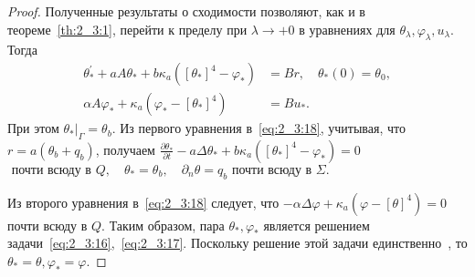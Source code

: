 \begin{proof}
    Полученные результаты о сходимости позволяют, как и в теореме~\ref{th:2_3:1},
    перейти к пределу при $\lambda \rightarrow+0$ в уравнениях для $\theta_{\lambda},
    \varphi_{\lambda}, u_{\lambda}$.
    Тогда
    \begin{equation}
        \label{eq:2_3:18}
        \begin{aligned}
            \theta_{*}^{\prime}+a A \theta_{*}
            + b \kappa_{a}\left(\left[\theta_{*}\right]^{4}
            - \varphi_{*}\right)&=B r, \quad \theta_{*}(0)=\theta_{0}, \\
            \alpha A \varphi_{*}+\kappa_{a}\left(\varphi_{*}
            - \left[\theta_{*}\right]^{4}\right)&=B u_{*}.
        \end{aligned}
    \end{equation}
    При этом $\left.\theta_{*}\right|_{\Gamma}=\theta_{b}$.
    Из первого уравнения в~\eqref{eq:2_3:18}, учитывая,
    что $r=a\left(\theta_{b}+q_{b}\right)$, получаем
    $
    \frac{\partial \theta_{*}}{\partial t}-a \Delta \theta_{*}
    +b \kappa_{a}\left(\left[\theta_{*}\right]^{4}-\varphi_{*}\right)=0$
    $\text { почти всюду в } Q, \quad \theta_{*}=\theta_{b},
    \quad \partial_{n} \theta=q_{b} \text { почти всюду в } \Sigma.
    $

    Из второго уравнения в~\eqref{eq:2_3:18} следует, что
    $-\alpha \Delta \varphi+\kappa_{a}\left(\varphi-[\theta]^{4}\right)=0$ почти всюду в $Q$.
    Таким образом, пара $\theta_{*}, \varphi_{*}$
    является решением задачи~\eqref{eq:2_3:16},~\eqref{eq:2_3:17}.
    Поскольку решение этой задачи единственно~\cite{Chebotarev2019Problem},
    то $\theta_{*}=\theta, \varphi_{*}=\varphi$.
\end{proof}
